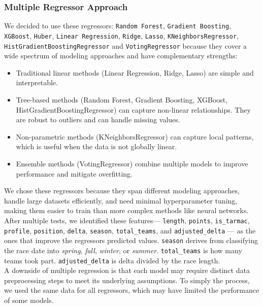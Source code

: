 \documentclass[a4paper, twoside]{article}
\begin{document}
\subsubsection{Multiple Regressor Approach}
We decided to use these regressors: \texttt{Random Forest}, \texttt{Gradient Boosting}, \texttt{XGBoost}, \texttt{Huber}, \texttt{Linear Regression}, \texttt{Ridge}, \texttt{Lasso}, \texttt{KNeighborsRegressor}, \\ \texttt{HistGradientBoostingRegressor} and \texttt{VotingRegressor} because they cover a wide spectrum of modeling approaches and have complementary strengths:
\begin{itemize}[noitemsep]
    \item Traditional linear methods (Linear Regression, Ridge, Lasso) are simple and interpretable.
    \item Tree-based methods (Random Forest, Gradient Boosting, XGBoost, HistGradientBoostingRegressor) can capture non-linear relationships. They are robust to outliers and can handle missing values.
    \item Non-parametric methods (KNeighborsRegressor) can capture local patterns, which is useful when the data is not globally linear.
    \item Ensemble methods (VotingRegressor) combine multiple models to improve performance and mitigate overfitting. 
\end{itemize}
We chose these regressors because they span different modeling approaches, handle large datasets efficiently, and need minimal hyperparameter tuning, making them easier to train than more complex methods like neural networks. \\
After multiple tests, we identified these features— \texttt{length}, \texttt{points}, \texttt{is\_tarmac}, \texttt{profile}, \texttt{position}, \texttt{delta}, \texttt{season}, \texttt{total\_teams}, and \texttt{adjusted\_delta} — as the ones that improve the regressors predicted values. \texttt{season} derives from classifying the race date into \textit{spring}, \textit{fall}, \textit{winter}, or \textit{summer}. \texttt{total\_teams} is how many teams took part. \texttt{adjusted\_delta} is delta divided by the race length.
\\
A downside of multiple regression is that each model may require distinct data preprocessing steps to meet its underlying assumptions.
To simply the process, we used the same data for all regressors, which may have limited the performance of some models.
\\ \\
\end{document}
